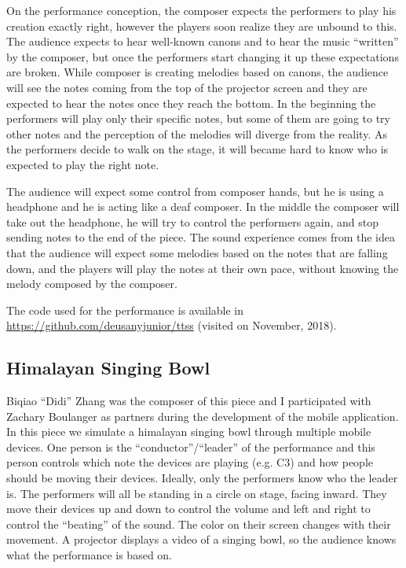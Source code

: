 On the performance conception, the composer expects the performers to play his creation exactly right, however the players soon realize they are unbound to this.
The audience expects to hear well-known canons and to hear the music ``written'' by the composer, but once the performers start changing it up these expectations are broken.
While composer is creating melodies based on canons, the audience will see the notes coming from the top of the projector screen and they are expected to hear the notes once they reach the bottom. 
In the beginning the performers will play only their specific notes, but some of them are going to try other notes and the perception of the melodies will diverge from the reality. 
As the performers decide to walk on the stage, it will became hard to know who is expected to play the right note.

The audience will expect some control from composer hands, but he is using a headphone and he is acting like a deaf composer. 
In the middle the composer will take out the headphone, he will try to control the performers again, and stop sending notes to the end of the piece.
The sound experience comes from the idea that the audience will expect some melodies based on the notes that are falling down, and the players will play the notes at their own pace, without knowing the melody composed by the composer.

The code used for the performance is available in \url{https://github.com/deusanyjunior/ttss} (visited on November, 2018).

\subsection*{Himalayan Singing Bowl}

Biqiao ``Didi'' Zhang was the composer of this piece and I participated with Zachary Boulanger as partners during the development of the mobile application.
In this piece we simulate a himalayan singing bowl through multiple mobile devices. 
One person is the ``conductor''/``leader'' of the performance and this person controls which note the devices are playing (e.g. C3) and how people should be moving their devices. 
Ideally, only the performers know who the leader is.
The performers will all be standing in a circle on stage, facing inward. 
They move their devices up and down to control the volume and left and right to control the ``beating'' of the sound. 
The color on their screen changes with their movement. 
A projector displays a video of a singing bowl, so the audience knows what the performance is based on.

